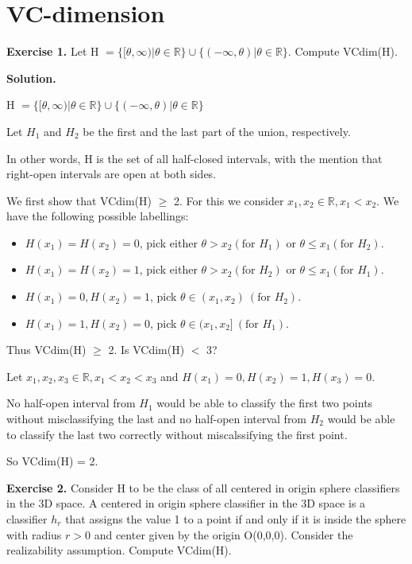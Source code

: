 \documentclass{article}
\newcommand{\<}{\langle}
\renewcommand{\>}{\rangle}
\theoremstyle{definition}
\begin{document}
\newpage

\section{VC-dimension}

\textbf{Exercise 1.} Let H $= \{ [\theta, \infty) | \theta \in \mathbb{R} \} \cup \{ (-\infty, \theta) | \theta \in \mathbb{R} \}$. Compute VCdim(H).

\textbf{Solution.} 

H $= \{ [\theta, \infty) | \theta \in \mathbb{R} \} \cup \{ (-\infty, \theta) | \theta \in \mathbb{R} \}$ 

Let $H_1$ and $H_2$ be the first and the last part of the union, respectively. 

In other words, H is the set of all half-closed intervals, with the mention that right-open intervals are open at both sides.

We first show that VCdim(H) $\geq$ 2. For this we consider $x_1, x_2 \in \mathbb{R}, x_1 < x_2$. We have the following possible labellings:

\begin{itemize}
    \item[] $H(x_1) = H(x_2) = 0$, pick either $\theta > x_2 (\text{for } H_1)$ or $\theta \leq x_1 (\text{for } H_2)$.
    \item[] $H(x_1) = H(x_2) = 1$, pick either $\theta > x_2 (\text{for } H_2)$ or $\theta \leq x_1 (\text{for } H_1)$.
    \item[] $H(x_1) = 0, H(x_2) = 1$, pick $\theta \in (x_1, x_2) \ (\text{for } H_2)$.
    \item[] $H(x_1) = 1, H(x_2) = 0$, pick $\theta \in (x_1, x_2] \ (\text{for } H_1)$.
\end{itemize}{}

Thus VCdim(H) $\geq$ 2. Is VCdim(H) $<$ 3?

Let $x_1, x_2, x_3 \in \mathbb{R}, x_1 < x_2 < x_3$ and $H(x_1) = 0, H(x_2) = 1, H(x_3) = 0$. 

No half-open interval from $H_1$ would be able to classify the first two points without misclassifying the last and no half-open interval from $H_2$ would be able to classify the last two correctly without miscalssifying the first point.

So VCdim(H) = 2.

\vspace{3mm}

\textbf{Exercise 2.} Consider H to be the class of all centered in origin sphere classifiers in the 3D space. A centered in origin sphere classifier in the 3D space is a classifier $h_r$ that assigns the value 1 to a point if and only if it is inside the sphere with radius $r > 0$ and center given by the origin O(0,0,0). Consider the realizability assumption. Compute VCdim(H).
\end{document}
